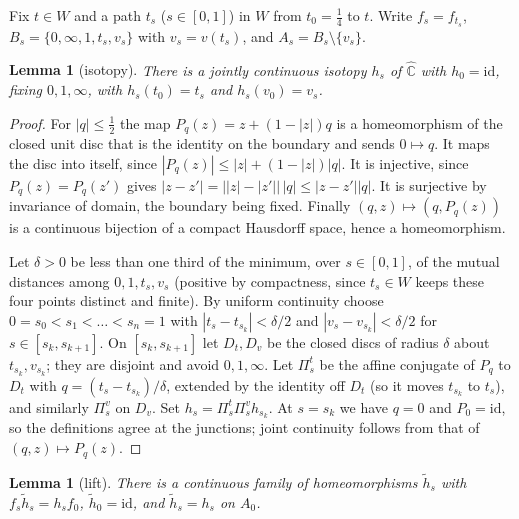\documentclass[11pt]{article}
\newtheorem{lemma}[proposition]{Lemma}
\theoremstyle{definition}
\newcommand{\Ch}{\hat{\mathbb C}}
\begin{document}

Fix $t\in W$ and a path $t_s$ ($s\in[0,1]$) in $W$ from $t_0=\tfrac14$ to $t$. Write $f_s=f_{t_s}$, $B_s=\{0,\infty,1,t_s,v_s\}$ with $v_s=v(t_s)$, and $A_s=B_s\setminus\{v_s\}$.

\begin{lemma}[isotopy]\label{lem:isotopy}
There is a jointly continuous isotopy $h_s$ of $\Ch$ with $h_0=\mathrm{id}$, fixing $0,1,\infty$, with $h_s(t_0)=t_s$ and $h_s(v_0)=v_s$.
\end{lemma}

\begin{proof}
For $|q|\le\tfrac12$ the map $P_q(z)=z+(1-|z|)q$ is a homeomorphism of the closed unit disc that is the identity on the boundary and sends $0\mapsto q$. It maps the disc into itself, since $|P_q(z)|\le|z|+(1-|z|)|q|$. It is injective, since $P_q(z)=P_q(z')$ gives $|z-z'|=\bigl||z|-|z'|\bigr|\,|q|\le|z-z'||q|$. It is surjective by invariance of domain, the boundary being fixed. Finally $(q,z)\mapsto(q,P_q(z))$ is a continuous bijection of a compact Hausdorff space, hence a homeomorphism.

Let $\delta>0$ be less than one third of the minimum, over $s\in[0,1]$, of the mutual distances among $0,1,t_s,v_s$ (positive by compactness, since $t_s\in W$ keeps these four points distinct and finite). By uniform continuity choose $0=s_0<s_1<\dots<s_n=1$ with $|t_s-t_{s_k}|<\delta/2$ and $|v_s-v_{s_k}|<\delta/2$ for $s\in[s_k,s_{k+1}]$. On $[s_k,s_{k+1}]$ let $D_t,D_v$ be the closed discs of radius $\delta$ about $t_{s_k},v_{s_k}$; they are disjoint and avoid $0,1,\infty$. Let $\Pi^t_s$ be the affine conjugate of $P_q$ to $D_t$ with $q=(t_s-t_{s_k})/\delta$, extended by the identity off $D_t$ (so it moves $t_{s_k}$ to $t_s$), and similarly $\Pi^v_s$ on $D_v$. Set $h_s=\Pi^t_s\Pi^v_s h_{s_k}$. At $s=s_k$ we have $q=0$ and $P_0=\mathrm{id}$, so the definitions agree at the junctions; joint continuity follows from that of $(q,z)\mapsto P_q(z)$.
\end{proof}

\begin{lemma}[lift]\label{lem:liftiso}
There is a continuous family of homeomorphisms $\tilde h_s$ with $f_s\tilde h_s=h_sf_0$, $\tilde h_0=\mathrm{id}$, and $\tilde h_s=h_s$ on $A_0$.
\end{lemma}
\end{document}
